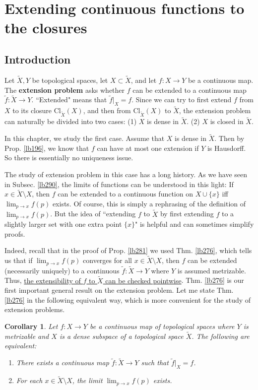 \documentclass[12pt,b5paper,notitlepage]{article}
\theoremstyle{definition}
\theoremstyle{plain}
\newtheorem{co}[df]{Corollary}
\newcommand{\wtd}{\widetilde}
\newcommand{\Cl}{\mathrm{Cl}}
\numberwithin{equation}{section}
\begin{document}
\newpage


\section{Extending continuous functions to the closures}



\subsection{Introduction}

Let $\wtd X,Y$ be topological spaces, let $X\subset \wtd X$, and let $f:X\rightarrow Y$ be a continuous map. The \textbf{extension problem} asks whether $f$ can be extended to a continuous map $\wtd f:\wtd X\rightarrow Y$. ``Extended" means that $\wtd f|_X=f$.  Since we can try to first extend $f$ from $X$ to its closure $\Cl_{\wtd X}(X)$, and then from $\Cl_{\wtd X}(X)$ to $\wtd X$, the extension problem can naturally be divided into two cases: (1) $X$ is dense in $\wtd X$. (2) $X$ is closed in $\wtd X$.

In this chapter, we study the first case. Assume that $X$ is dense in $\wtd X$. Then by Prop. \ref{lb196}, we know that $f$ can have at most one extension if $Y$ is Hausdorff. So there is essentially no uniqueness issue. 


The study of extension problem in this case has a long history. As we have seen in Subsec. \ref{lb290}, the limits of functions can be understood in this light: If $x\in\wtd X\setminus X$, then $f$ can be extended to a continuous function on $X\cup\{x\}$ iff $\lim_{p\rightarrow x}f(p)$ exists. Of course, this is simply a rephrasing of the definition of $\lim_{p\rightarrow x}f(p)$. But the idea of ``extending $f$ to $\wtd X$ by first extending $f$ to a slightly larger set with one extra point $\{x\}$" is helpful and can sometimes simplify proofs.

Indeed, recall that in the proof of Prop. \ref{lb281} we used Thm. \ref{lb276}, which tells us that if $\lim_{p\rightarrow x}f(p)$ converges for all $x\in\wtd X\setminus X$, then $f$ can be extended (necessarily uniquely) to a continuous $\wtd f:\wtd X\rightarrow Y$ where $Y$ is assumed metrizable. Thus, \uline{the extensibility of $f$ to $\wtd X$ can be checked pointwise}. Thm. \ref{lb276} is our first important general result on the extension problem. Let me state Thm. \ref{lb276} in the following equivalent way, which is more convenient for the  study of extension problems.
\begin{co}\label{lb307}
Let $f:X\rightarrow Y$ be a continuous map of topological spaces where $Y$ is metrizable and $X$ is a dense subspace of a topological space $\wtd X$. The following are equivalent:
\begin{enumerate}[label=(\arabic*)]
\item There exists a continuous map $\wtd f:\wtd X\rightarrow Y$ such that $\wtd f|_X= f$.
\item For each $x\in\wtd X\setminus X$, the limit $\lim_{p\rightarrow x}f(p)$ exists.
\end{enumerate}
\end{co}
\end{document}
